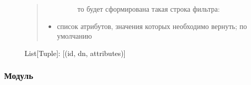 \documentclass[a4paper,10pt,russian]{sphinxmanual}
\begin{document}
\begin{fulllineitems}
\begin{fulllineitems}
\begin{description}
\begin{quote}
\begin{itemize}
\begin{description}
\sphinxAtStartPar
то будет сформирована такая строка фильтра:

\end{description}

\item {} \begin{description}
\sphinxAtStartPar
список атрибутов, значения которых необходимо
вернуть; по умолчанию \sphinxhyphen{} \sphinxcode{\sphinxupquote{{[}\textquotesingle{}*\textquotesingle{}{]}}}

\end{description}

\end{itemize}
\end{quote}

\sphinxAtStartPar
List{[}Tuple{]}: {[}(id, dn, attributes){]}

\end{description}

\end{fulllineitems}


\end{fulllineitems}



\subsubsection{Модуль }
\label{\detokenize{developer:logger}}
\end{document}
